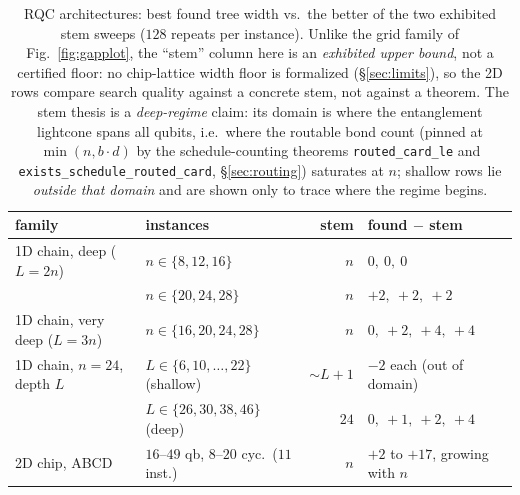 \documentclass[sigplan,10pt,screen,review,anonymous]{acmart}
\begin{document}
\begin{table}[t]
\caption{RQC architectures: best found tree width vs.\ the better of the two exhibited stem
sweeps ($128$ repeats per instance). Unlike the grid family of Fig.~\ref{fig:gapplot}, the
``stem'' column here is an \emph{exhibited upper bound}, not a certified floor: no
chip-lattice width floor is formalized (\S\ref{sec:limits}), so the 2D rows compare search
quality against a concrete stem, not against a theorem. The stem thesis is a
\emph{deep-regime} claim: its
domain is where the entanglement lightcone spans all qubits, i.e.\ where the routable bond
count (pinned at $\min(n, b\cdot d)$ by the schedule-counting theorems
\lstinline|routed_card_le| and \lstinline|exists_schedule_routed_card|,
\S\ref{sec:routing}) saturates at $n$; shallow rows lie \emph{outside that domain} and
are shown only to trace where the regime begins.}
\label{tab:rqc}
\centering\small
\begin{tabular}{llrl}
\hline
family & instances & stem & found $-$ stem \\
\hline
1D chain, deep ($L{=}2n$) & $n \in \{8, 12, 16\}$ & $n$ & $0,\ 0,\ 0$ \\
                          & $n \in \{20, 24, 28\}$ & $n$ & $+2,\ +2,\ +2$ \\
1D chain, very deep ($L{=}3n$) & $n \in \{16, 20, 24, 28\}$ & $n$ & $0,\ +2,\ +4,\ +4$ \\
1D chain, $n{=}24$, depth $L$ & $L \in \{6, 10, \ldots, 22\}$ (shallow) & $\sim L{+}1$ & $-2$ each (out of domain) \\
                          & $L \in \{26, 30, 38, 46\}$ (deep) & $24$ & $0,\ +1,\ +2,\ +4$ \\
2D chip, ABCD & $16$--$49$ qb, $8$--$20$ cyc.\ ($11$ inst.) & $n$ & $+2$ to $+17$, growing with $n$ \\
\hline
\end{tabular}
\end{table}
\end{document}
